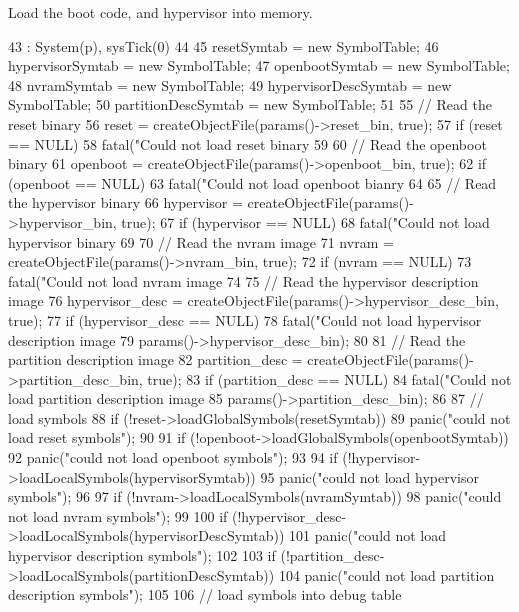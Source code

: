 Load the boot code, and hypervisor into memory.


\begin{DoxyCode}
43     : System(p), sysTick(0)
44 {
45     resetSymtab = new SymbolTable;
46     hypervisorSymtab = new SymbolTable;
47     openbootSymtab = new SymbolTable;
48     nvramSymtab = new SymbolTable;
49     hypervisorDescSymtab = new SymbolTable;
50     partitionDescSymtab = new SymbolTable;
51 
55     // Read the reset binary
56     reset = createObjectFile(params()->reset_bin, true);
57     if (reset == NULL)
58         fatal("Could not load reset binary %
59 
60     // Read the openboot binary
61     openboot = createObjectFile(params()->openboot_bin, true);
62     if (openboot == NULL)
63         fatal("Could not load openboot bianry %
64 
65     // Read the hypervisor binary
66     hypervisor = createObjectFile(params()->hypervisor_bin, true);
67     if (hypervisor == NULL)
68         fatal("Could not load hypervisor binary %
69 
70     // Read the nvram image
71     nvram = createObjectFile(params()->nvram_bin, true);
72     if (nvram == NULL)
73         fatal("Could not load nvram image %
74 
75     // Read the hypervisor description image
76     hypervisor_desc = createObjectFile(params()->hypervisor_desc_bin, true);
77     if (hypervisor_desc == NULL)
78         fatal("Could not load hypervisor description image %
79                 params()->hypervisor_desc_bin);
80 
81     // Read the partition description image
82     partition_desc = createObjectFile(params()->partition_desc_bin, true);
83     if (partition_desc == NULL)
84         fatal("Could not load partition description image %
85                 params()->partition_desc_bin);
86 
87     // load symbols
88     if (!reset->loadGlobalSymbols(resetSymtab))
89         panic("could not load reset symbols\n");
90 
91     if (!openboot->loadGlobalSymbols(openbootSymtab))
92         panic("could not load openboot symbols\n");
93 
94     if (!hypervisor->loadLocalSymbols(hypervisorSymtab))
95         panic("could not load hypervisor symbols\n");
96 
97     if (!nvram->loadLocalSymbols(nvramSymtab))
98         panic("could not load nvram symbols\n");
99 
100     if (!hypervisor_desc->loadLocalSymbols(hypervisorDescSymtab))
101         panic("could not load hypervisor description symbols\n");
102 
103     if (!partition_desc->loadLocalSymbols(partitionDescSymtab))
104         panic("could not load partition description symbols\n");
105 
106     // load symbols into debug table
}
\end{DoxyCode}
